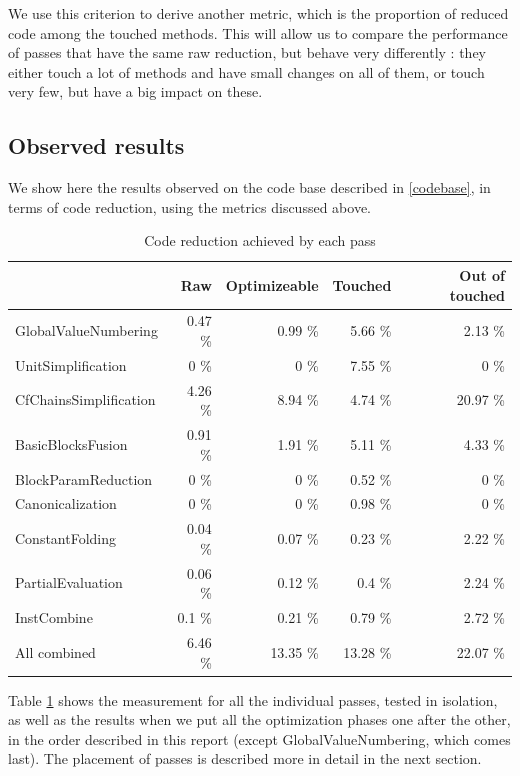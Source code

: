 \documentclass[11pt,a4paper]{article}
\newcommand{\scala}[1]{\textsf{#1}}
\newcommand{\perf}[1]{#1 \%}
\begin{document}
We use this criterion to derive another metric, which is the proportion of reduced code among the touched methods. This will allow us to compare the performance of passes that have the same raw reduction, but behave very differently : they either touch a lot of methods and have small changes on all of them, or touch very few, but have a big impact on these.


\subsection{Observed results}

We show here the results observed on the code base described in \ref{codebase}, in terms of code reduction, using the metrics discussed above.

\begin{table}
	\centering
	\begin{tabular}{| l | r | r | r | r |}
\hline
                  & Raw         & Optimizeable & Touched     & Out of touched \\ \hline
GlobalValueNumbering & \perf{0.47} & \perf{0.99}  & \perf{5.66} & \perf{2.13} \\ \hline
UnitSimplification & \perf{0} & \perf{0}  & \perf{7.55} & \perf{0} \\
CfChainsSimplification & \perf{4.26} & \perf{8.94}  & \perf{4.74} & \perf{20.97} \\
BasicBlocksFusion & \perf{0.91} & \perf{1.91}  & \perf{5.11} & \perf{4.33} \\
BlockParamReduction & \perf{0} & \perf{0}  & \perf{0.52} & \perf{0} \\ \hline
Canonicalization & \perf{0} & \perf{0}  & \perf{0.98} & \perf{0} \\
ConstantFolding & \perf{0.04} & \perf{0.07}  & \perf{0.23} & \perf{2.22} \\
PartialEvaluation & \perf{0.06} & \perf{0.12}  & \perf{0.4} & \perf{2.24} \\
InstCombine & \perf{0.1} & \perf{0.21}  & \perf{0.79} & \perf{2.72} \\ \hline
All combined & \perf{6.46} & \perf{13.35}  & \perf{13.28} & \perf{22.07} \\ 
\hline
	\end{tabular}
	\caption{Code reduction achieved by each pass}
	\label{restable}
\end{table}

Table \ref{restable} shows the measurement for all the individual passes, tested in isolation, as well as the results when we put all the optimization phases one after the other, in the order described in this report (except \scala{GlobalValueNumbering}, which comes last). The placement of passes is described more in detail in the next section.
\end{document}
